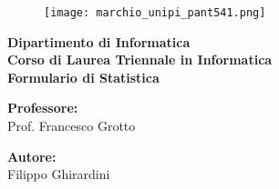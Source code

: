 \begin{titlepage} %
	\begin{figure}[t] %
		\centering\texttt{[image: marchio\_unipi\_pant541.png]}
	\end{figure}
	\vspace{20mm}
	
	\begin{Large}
		\begin{center}
			\textbf{Dipartimento di Informatica\\ Corso di Laurea Triennale in Informatica\\}
			\vspace{20mm}
			{\huge{\bf Formulario di Statistica}}\\
		\end{center}
	\end{Large}
	
	
	\vspace{36mm}
	\begin{minipage}[t]{0.47\textwidth}
		{\large{\bf Professore:}\\ \large{Prof. Francesco Grotto}}
	\end{minipage}
	\hfill
	\begin{minipage}[t]{0.47\textwidth}\raggedleft
		{\large{\bf Autore:}\\ \large{Filippo Ghirardini}}
	\end{minipage}
	
	\vspace{25mm}
	
	\hrulefill
	
	\vspace{5mm}
	
	
\end{titlepage}
